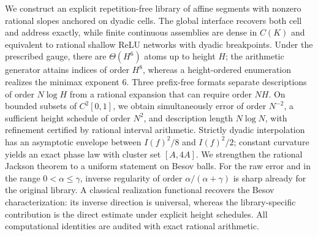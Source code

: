 We construct an explicit repetition-free library of affine segments with nonzero rational slopes anchored on dyadic cells. The global interface recovers both cell and address exactly, while finite continuous assemblies are dense in $C(K)$ and equivalent to rational shallow ReLU networks with dyadic breakpoints. Under the prescribed gauge, there are $\Theta(H^6)$ atoms up to height $H$; the arithmetic generator attains indices of order $H^8$, whereas a height-ordered enumeration realizes the minimax exponent $6$. Three prefix-free formats separate descriptions of order $N\log H$ from a rational expansion that can require order $NH$. On bounded subsets of $C^2[0,1]$, we obtain simultaneously error of order $N^{-2}$, a sufficient height schedule of order $N^2$, and description length $N\log N$, with refinement certified by rational interval arithmetic. Strictly dyadic interpolation has an asymptotic envelope between $I(f)^2/8$ and $I(f)^2/2$; constant curvature yields an exact phase law with cluster set $[A,4A]$. We strengthen the rational Jackson theorem to a uniform statement on Besov balls. For the raw error and in the range $0<\alpha\le\gamma$, inverse regularity of order $\alpha/(\alpha+\gamma)$ is sharp already for the original library. A classical realization functional recovers the Besov characterization: its inverse direction is universal, whereas the library-specific contribution is the direct estimate under explicit height schedules. All computational identities are audited with exact rational arithmetic.
